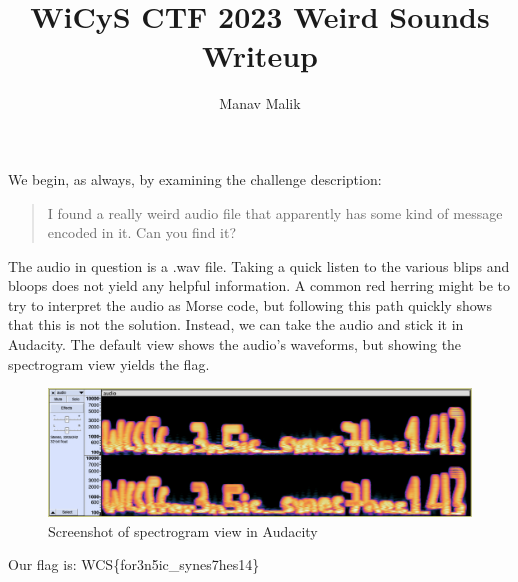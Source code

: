 \documentclass{article}
\title{WiCyS CTF 2023 Weird Sounds Writeup}
\author{Manav Malik}
\date{}
\begin{document}
\maketitle

We begin, as always, by examining the challenge description:

\begin{quote}
    I found a really weird audio file that apparently has some kind of message encoded in it. Can you find it?
\end{quote}
The audio in question is a {\sf .wav} file. Taking a quick listen to the various blips and bloops does not yield any helpful information. A common red herring might be to try to interpret the audio as Morse code, but following this path quickly shows that this is not the solution. Instead, we can take the audio and stick it in Audacity. The default view shows the audio's waveforms, but showing the spectrogram view yields the flag.
\begin{figure}
    \centering
    \includegraphics[width=\linewidth]{writeup_ss.png}
    \caption{Screenshot of spectrogram view in Audacity}
    \label{fig:flag-ss}
\end{figure}
Our flag is: {\sf WCS\{for3n5ic\_synes7hes14\}}
\end{document}
